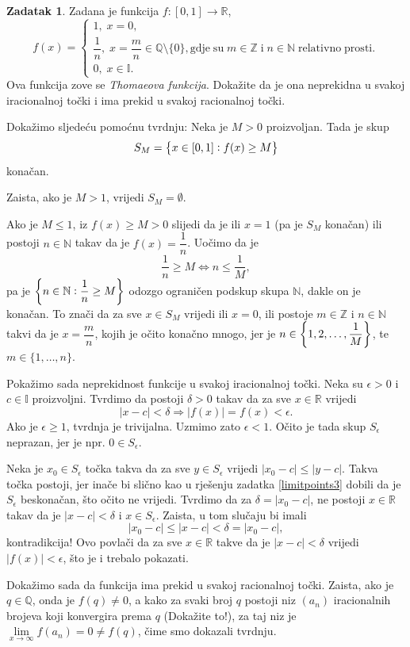 \documentclass{book}
\let\originalleft\left
\let\originalright\right
\renewcommand{\left}{\mathopen{}\mathclose\bgroup\originalleft}
\renewcommand{\right}{\aftergroup\egroup\originalright}
\renewenvironment{proof}{%
    \vspace{-\parskip}\begin{oldproof}%
    }{%
    \end{oldproof}%
}
\theoremstyle{definition}
\theoremstyle{definition}
\newtheorem{exercise}{Zadatak}
\theoremstyle{remark}
\begin{document}
\begin{exercise}
Zadana je funkcija $f : [0, 1]\to \mathbb{R}$, $$f(x)=\begin{cases}
1, \; x=0,\\
\dfrac{1}{n},\; x=\dfrac{m}{n}\in \mathbb{Q}\setminus\{0\},\mathrm{gdje\;su\;}m\in \mathbb{Z}\mathrm{\;i\;}n\in \mathbb{N}\mathrm{\;relativno\;prosti.}\\
0,\; x\in \mathbb{I}.
\end{cases}$$
Ova funkcija zove se \textit{Thomaeova funkcija}. Dokažite da je ona neprekidna u svakoj iracionalnoj točki i ima prekid u svakoj racionalnoj točki.
\end{exercise}
\begin{proof}[Rješenje]
Dokažimo sljedeću pomoćnu tvrdnju: Neka je $M>0$ proizvoljan. Tada je skup
$$S_M=\left\{x\in[0, 1] : f(x)\geq M\right\}$$
konačan. 

Zaista, ako je $M>1$, vrijedi $S_M=\emptyset$. 

Ako je $M\leq 1$, iz $f(x)\geq M>0$ slijedi da je ili $x=1$ (pa je $S_M$ konačan) ili postoji $n\in \mathbb{N}$ takav da je $f(x)=\dfrac{1}{n}$. Uočimo da je $$\dfrac{1}{n}\geq M\Longleftrightarrow n\leq \dfrac{1}{M},$$ pa je $\left\{n\in \mathbb{N} : \dfrac{1}{n}\geq M\right\}$ odozgo ograničen podskup skupa $\mathbb{N}$, dakle on je konačan. To znači da za sve $x\in S_M$ vrijedi ili $x=0$, ili postoje $m\in \mathbb{Z}$ i $n\in \mathbb{N}$ takvi da je $x=\dfrac{m}{n}$, kojih je očito konačno mnogo, jer je $n\in \left\{1, 2,\dots, \dfrac{1}{M}\right\}$, te $m\in \{1, \dots, n\}$.

Pokažimo sada neprekidnost funkcije u svakoj iracionalnoj točki. Neka su $\epsilon>0$ i $c\in \mathbb{I}$ proizvoljni. Tvrdimo da postoji $\delta>0$ takav da za sve $x\in \mathbb{R}$ vrijedi $$|x-c|<\delta\Rightarrow |f(x)|=f(x)<\epsilon.$$ 
Ako je $\epsilon\geq 1$, tvrdnja je trivijalna. Uzmimo zato $\epsilon<1$. Očito je tada skup $S_\epsilon$ neprazan, jer je npr. $0\in S_\epsilon$.

Neka je $x_0\in S_\epsilon$ točka takva da za sve $y\in S_\epsilon$ vrijedi $|x_0-c|\leq|y-c|$. Takva točka postoji, jer inače bi slično kao u rješenju zadatka \ref{limitpoints3} dobili da je $S_\epsilon$ beskonačan, što očito ne vrijedi. Tvrdimo da za $\delta=|x_0-c|$, ne postoji $x\in \mathbb{R}$ takav da je $|x-c|<\delta$ i $x\in S_\epsilon$. Zaista, u tom slučaju bi imali $$|x_0-c|\leq |x-c|<\delta=|x_0-c|,$$ kontradikcija! Ovo povlači da za sve $x\in \mathbb{R}$ takve da je $|x-c|<\delta$ vrijedi $|f(x)|<\epsilon$, što je i trebalo pokazati.

Dokažimo sada da funkcija ima prekid u svakoj racionalnoj točki. Zaista, ako je $q\in \mathbb{Q}$, onda je $f(q)\neq 0$, a kako za svaki broj $q$ postoji niz $(a_n)$ iracionalnih brojeva koji konvergira prema $q$ (Dokažite to!), za taj niz je $\lim\limits_{x\to \infty}{f(a_n)}=0\neq f(q)$, čime smo dokazali tvrdnju.
\end{proof}
\end{document}

